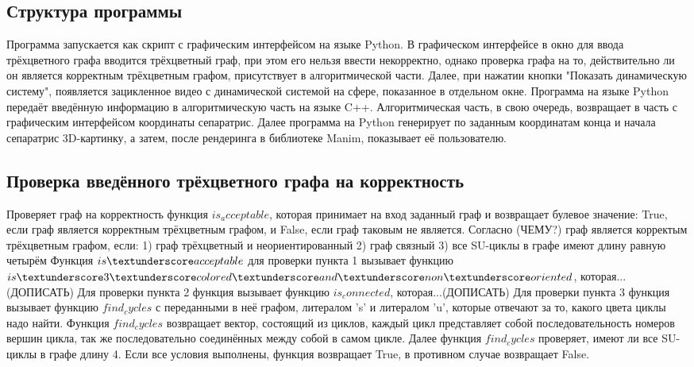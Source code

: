 	\subsection{Структура программы}
	Программа запускается как скрипт с графическим интерфейсом на языке Python. В графическом интерфейсе в окно для ввода трёхцветного графа вводится трёхцветный граф, при этом его нельзя ввести некорректно, однако проверка графа на то, действительно ли он является корректным трёхцветным графом, присутствует в алгоритмической части. Далее, при нажатии кнопки "Показать динамическую систему", появляется зацикленное видео с динамической системой на сфере, показанное в отдельном окне. Программа на языке Python передаёт введённую информацию в алгоритмическую часть на языке C++. Алгоритмическая часть, в свою очередь, возвращает в часть с графическим интерфейсом координаты сепаратрис. Далее программа на Python генерирует по заданным координатам конца и начала сепаратрис 3D-картинку, а затем, после рендеринга в библиотеке Manim, показывает её пользователю.
	\subsection{Проверка введённого трёхцветного графа на корректность}
	Проверяет граф на корректность функция $is_acceptable$, которая принимает на вход заданный граф и возвращает булевое значение: True, если граф является корректным трёхцветным графом, и False, если граф таковым не является. Согласно (ЧЕМУ?) граф является корректым трёхцветным графом, если:
	1) граф трёхцветный и неориентированный
	2) граф связный
	3) все SU-циклы в графе имеют длину равную четырём 
	Функция $is \textunderscore acceptable$ для проверки пункта 1 вызывает функцию $is \textunderscore 3 \textunderscore colored \textunderscore and \textunderscore non \textunderscore oriented$, которая...(ДОПИСАТЬ)
	Для проверки пункта 2 функция вызывает функцию $is_connected$, которая...(ДОПИСАТЬ)
	Для проверки пункта 3 функция вызывает функцию $find_cycles$ с переданными в неё графом, литералом 's' и литералом 'u', которые отвечают за то, какого цвета циклы надо найти. Функция $find_cycles$ возвращает вектор, состоящий из циклов, каждый цикл представляет собой последовательность номеров вершин цикла, так же последовательно соединённых между собой в самом цикле. Далее функция $find_cycles$ проверяет, имеют ли все SU-циклы в графе длину 4.
	Если все условия выполнены, функция возвращает True, в противном случае возвращает False.
